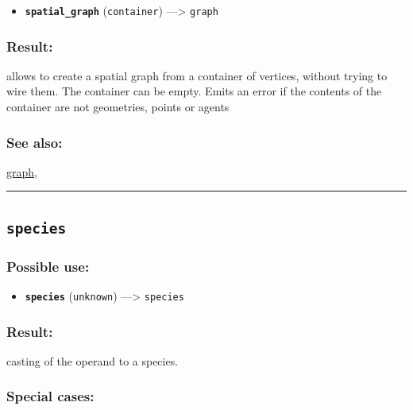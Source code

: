 \documentclass[]{book}
\providecommand{\tightlist}{%
  \setlength{\itemsep}{0pt}\setlength{\parskip}{0pt}}
\theoremstyle{definition}
\theoremstyle{definition}
\theoremstyle{definition}
\theoremstyle{remark}
\begin{document}
\begin{itemize}
\tightlist
\item
  \textbf{\texttt{spatial\_graph}} (\texttt{container})
  ---\textgreater{} \texttt{graph}
\end{itemize}

\subsubsection{Result:}\label{result-472}

allows to create a spatial graph from a container of vertices, without
trying to wire them. The container can be empty. Emits an error if the
contents of the container are not geometries, points or agents

\subsubsection{See also:}\label{see-also-190}

\href{operators-d-to-h.html\#graph}{graph},

\begin{center}\rule{0.5\linewidth}{\linethickness}\end{center}

\subsection{\texorpdfstring{\texttt{species}}{species}}\label{species}

\subsubsection{Possible use:}\label{possible-use-489}

\begin{itemize}
\tightlist
\item
  \textbf{\texttt{species}} (\texttt{unknown}) ---\textgreater{}
  \texttt{species}
\end{itemize}

\subsubsection{Result:}\label{result-473}

casting of the operand to a species.

\subsubsection{Special cases:}\label{special-cases-126}
\end{document}
